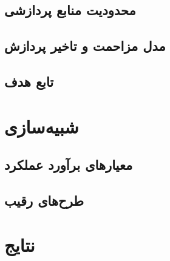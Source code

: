 \subsection{محدودیت منابع پردازشی}
\subsection{مدل مزاحمت و تاخیر پردازش}
\subsection{تابع هدف}
\section{شبیه‌سازی}
\subsection{معیارهای برآورد عملکرد}
\subsection{طرح‌های رقیب}
\section{نتایج}
